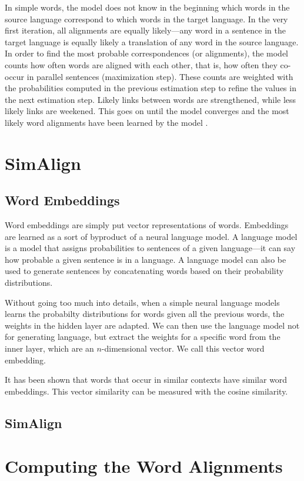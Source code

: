 In simple words, the model does not know in the beginning which words in the source language correspond to which words in the target language. 
In the very first iteration, all alignments are equally likely---any word in a sentence in the target language is equally likely a translation of any word in the source language.
In order to find the most probable correspondences (or alignments), the model counts how often words are aligned with each other, that is, how often they co-occur in parallel sentences (maximization step). 
These counts are weighted with the probabilities computed in the previous estimation step to refine the values in the next estimation step. 
Likely links between words are strengthened, while less likely links are weekened. 
This goes on until the model converges and the most likely word alignments have been learned by the model \autocites[88-92]{koehn2009}{brown-etal-1993-mathematics}. 


\section{SimAlign}


\subsection{Word Embeddings}
Word embeddings are simply put vector representations of words. 
Embeddings are learned as a sort of byproduct of a neural language model.
A language model is a model that assigns probabilities to sentences of a given language---it can say how probable a given sentence is in a language. 
A language model can also be used to generate sentences by concatenating words based on their probability distributions.

Without going too much into details, when a simple neural language models learns the probabilty distributions for words given all the previous words, the weights in the hidden layer are adapted. 
We can then use the language model not for generating language, but extract the weights for a specific word from the inner layer, which are an $n$-dimensional vector.
We call this vector word embedding.

It has been shown that words that occur in similar contexts have similar word embeddings. 
This vector similarity can be measured with the cosine similarity.

\subsection{SimAlign}


\section{Computing the Word Alignments}




